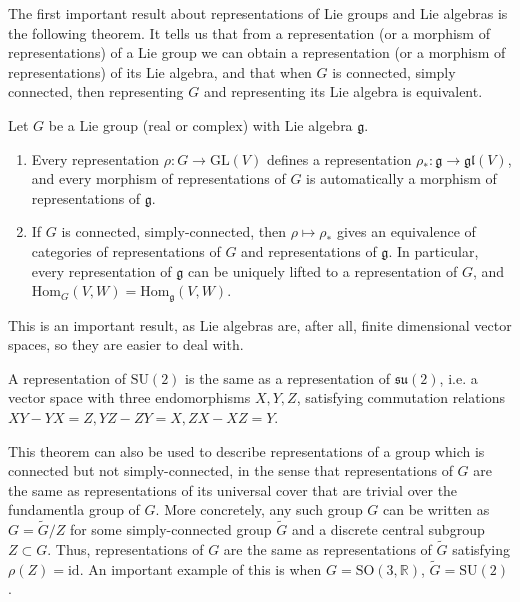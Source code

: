 \documentclass{report}
\begin{document}
The first important result about representations of Lie groups and Lie algebras is the following theorem.
It tells us that from a representation (or a morphism of representations) of a Lie group we can obtain a representation (or a morphism of representations) of its Lie algebra, and that when $G$ is connected, simply connected, then representing $G$ and representing its Lie algebra is equivalent.
\begin{theorem}
Let \( G \) be a Lie group (real or complex) with Lie algebra \( \mathfrak{g} \).
\begin{enumerate}
    \item Every representation \( \rho : G \to \mathrm{GL}(V) \) defines a representation \( \rho_* : \mathfrak{g} \to \mathfrak{gl}(V) \), and every morphism of representations of \( G \) is automatically a morphism of representations of \( \mathfrak{g} \).
    \item If \( G \) is connected, simply-connected, then \( \rho \mapsto \rho_* \) gives an equivalence of categories of representations of \( G \) and representations of \( \mathfrak{g} \). In particular, every representation of \( \mathfrak{g} \) can be uniquely lifted to a representation of \( G \), and \( \mathrm{Hom}_G(V, W) = \mathrm{Hom}_{\mathfrak{g}}(V, W) \).
\end{enumerate}
\end{theorem}
This is an important result, as Lie algebras are, after all, finite dimensional vector spaces, so they are easier to deal with.
\begin{example}
    A representation of \( \mathrm{SU}(2) \) is the same as a representation of \( \mathfrak{su}(2) \), i.e. a vector space with three endomorphisms \( X, Y, Z \), satisfying commutation relations \( XY - YX = Z, YZ - ZY = X, ZX - XZ = Y \).
\end{example}
\begin{remark}
    This theorem can also be used to describe representations of a group which is connected but not simply-connected, in the sense that representations of $G$ are the same as representations of its universal cover that are trivial over the fundamentla group of $G$.
    More concretely, any such group $G$ can be written as \( G = \tilde{G}/Z \) for some simply-connected group \( \tilde{G} \) and a discrete central subgroup \( Z \subset G \). Thus, representations of \( G \) are the same as representations of \( \tilde{G} \) satisfying \( \rho(Z) = \mathrm{id} \). An important example of this is when \( G = \mathrm{SO}(3, \mathbb{R}) \), \( \tilde{G} = \mathrm{SU}(2) \).
\end{remark}
\end{document}
